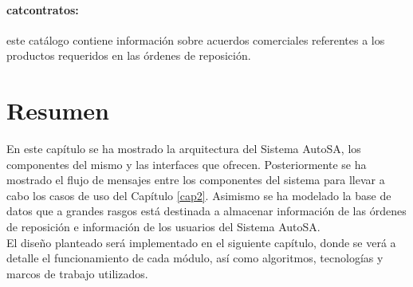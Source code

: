 \paragraph{cat{\textunderscore}contratos:} este catálogo contiene información sobre acuerdos comerciales referentes a los productos requeridos en las órdenes de reposición.


\section{Resumen}
En este capítulo se ha mostrado la arquitectura del Sistema AutoSA, los componentes del mismo y las interfaces que ofrecen. Posteriormente se ha mostrado el flujo de mensajes entre los componentes del sistema para llevar a cabo los casos de uso del Capítulo \ref{cap2}. Asimismo se ha modelado la base de datos que a grandes rasgos está destinada a almacenar información de las órdenes de reposición e información de los usuarios del Sistema AutoSA.\\
El diseño planteado será implementado en el siguiente capítulo, donde se verá a detalle el funcionamiento de cada módulo, así como algoritmos, tecnologías y marcos de trabajo utilizados. 